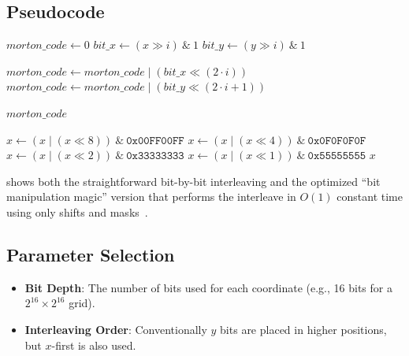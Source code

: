

\subsection{Pseudocode}
\begin{algorithm}
\caption{Morton Code: Coordinates to Index}\label{alg:xy_to_morton}
\begin{algorithmic}
    \State $morton\_code \gets 0$
        \State $bit\_x \gets (x \gg i) \ \& \ 1$
        \State $bit\_y \gets (y \gg i) \ \& \ 1$

        \State $morton\_code \gets morton\_code \mid (bit\_x \ll (2 \cdot i))$
        \State $morton\_code \gets morton\_code \mid (bit\_y \ll (2 \cdot i + 1))$
    \EndFor

    \Return $morton\_code$
\EndFunction

\Statex

    \State $x \gets (x \mid (x \ll 8)) \ \& \ \texttt{0x00FF00FF}$
    \State $x \gets (x \mid (x \ll 4)) \ \& \ \texttt{0x0F0F0F0F}$
    \State $x \gets (x \mid (x \ll 2)) \ \& \ \texttt{0x33333333}$
    \State $x \gets (x \mid (x \ll 1)) \ \& \ \texttt{0x55555555}$
    \Return $x$
\EndFunction
\end{algorithmic}
\end{algorithm}
 shows both the straightforward bit-by-bit interleaving and the optimized ``bit manipulation magic'' version that performs the interleave in $O(1)$ constant time using only shifts and masks~\cite{morton1966}.

\subsection{Parameter Selection}
\begin{itemize}
    \item \textbf{Bit Depth}: The number of bits used for each coordinate (e.g., 16 bits for a $2^{16} \times 2^{16}$ grid).
    \item \textbf{Interleaving Order}: Conventionally $y$ bits are placed in higher positions, but $x$-first is also used.
\end{itemize}

